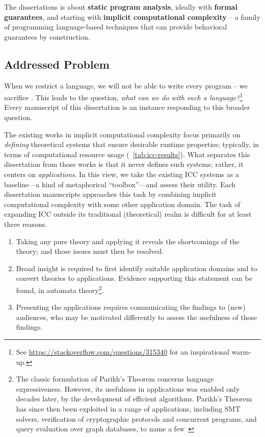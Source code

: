\vspace{1em}\noindent{}
\begin{mdframed}[backgroundcolor=conceptbase,linecolor=concept,nobreak=true]
The dissertations is about \textbf{static program analysis}, ideally with
\textbf{formal guarantees}, and starting with \textbf{implicit computational
complexity} -- a family of programming language-based techniques that can provide
behavioral guarantees by construction.
\end{mdframed}

\subsection{Addressed Problem}
\label{subsec:problem}

When we restrict a language, we will not be able to write every program -- \ie we sacrifice .
This leads to the question, \emph{what can we do with such a language?}\footnote{
See \url{https://stackoverflow.com/questions/315340} for an inspirational warm-up.}
Every manuscript of this dissertation is an instance responding to this broader question.

The existing works in implicit computational complexity focus primarily on \emph{defining} theoretical systems that ensure desirable runtime properties;
typically, in terms of computational resource usage (\cf~\autoref{tab:icc-results}).
What separates this dissertation from those works is that it never defines such systems;
rather, it centers on \emph{applications}.
In this view, we take the existing ICC systems as a baseline---a kind of metaphorical \enquote{toolbox}---and assess their utility.
Each dissertation manuscripts approaches this task by combining implicit computational complexity with some other application domain.
The task of expanding ICC outside its traditional (theoretical) realm is difficult for at least three reasons.

\begin{enumerate}

\item Taking any pure theory and applying it reveals the shortcomings of the theory;
      and those issues must then be resolved.

\item Broad insight is required to first identify suitable application domains and to convert theories to applications.
Evidence supporting this statement can be found, \eg in automata theory\footnote{
The classic formulation of Parikh's Theorem concerns language expressiveness.
However, its usefulness in applications was enabled {only decades later}, by the development of efficient algorithms.
Parikh's Theorem has since then been exploited in a range of applications, including SMT solvers, verification of cryptographic protocols and concurrent programs, and query evaluation over graph databases, to name a few~\cite[pg. 2]{hague2024}}.

\item Presenting the applications requires communicating the findings to (new) audiences, who may be motivated differently to assess the {usefulness} of those findings.
\end{enumerate}


